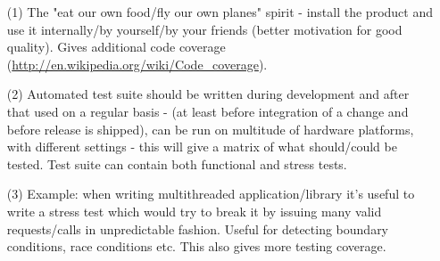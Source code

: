 \begin{itemize}
\item[(1)] The "eat our own food/fly our own planes" spirit - install
  the product and use it internally/by yourself/by your friends
  (better motivation for good quality). Gives additional
  code coverage (\url{http://en.wikipedia.org/wiki/Code\_coverage}).
\item[(2)] Automated test suite should be written during development and
  after that used on a regular basis - (at least before integration of a
  change and before release is shipped),
  can be run on multitude of hardware platforms, with different settings -
  this will give a matrix of what should/could be tested. Test suite can
  contain both functional and stress tests.
\item[(3)] Example: when writing multithreaded application/library it's
  useful to write a stress test which would try to break it by issuing many
  valid requests/calls in unpredictable fashion. Useful for detecting
  boundary conditions, race conditions etc. This also gives more testing
  coverage.
\end{itemize}

\endinput
